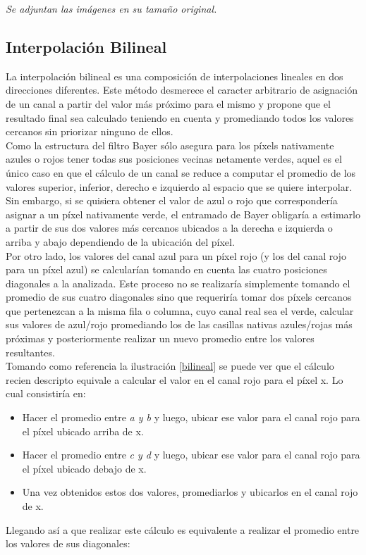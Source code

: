 \documentclass[a4paper]{article}
\begin{document}
\textit{Se adjuntan las im\'agenes en su tama\~no original.}

\newpage
\subsection{Interpolaci\'on Bilineal}

La interpolación bilineal es una composición de interpolaciones lineales en dos direcciones diferentes. Este método desmerece el caracter arbitrario de asignación de un canal a partir del valor más próximo para el mismo y propone que el resultado final sea calculado teniendo en cuenta y promediando todos los valores cercanos sin priorizar ninguno de ellos. \\

Como la estructura del filtro Bayer sólo asegura para los p\'ixels nativamente azules o rojos tener todas sus posiciones vecinas netamente verdes, aquel es el único caso en que el cálculo de un canal se reduce a computar el promedio de los valores superior, inferior, derecho e izquierdo al espacio que se quiere interpolar.\\

Sin embargo, si se quisiera obtener el valor de azul o rojo que correspondería asignar a un p\'ixel nativamente verde, el entramado de Bayer obligaría a estimarlo a partir de sus dos valores m\'as cercanos ubicados a la derecha e izquierda o arriba y abajo dependiendo de la ubicaci\'on del p\'ixel. \\

Por otro lado, los valores del canal azul para un p\'ixel rojo (y los del canal rojo para un p\'ixel azul) se calcularían tomando en cuenta las cuatro posiciones diagonales a la analizada. Este proceso no se realizar\'ia simplemente tomando el promedio de sus cuatro diagonales sino que requeriría tomar dos p\'ixels cercanos que pertenezcan a la misma fila o columna, cuyo canal real sea el verde, calcular sus valores de azul/rojo promediando los de las casillas nativas azules/rojas más próximas y posteriormente realizar un nuevo promedio entre los valores resultantes.\\

Tomando como referencia la ilustración \ref{bilineal} se puede ver que el cálculo recien descripto equivale a calcular el valor en el canal rojo para el p\'ixel x. Lo cual consistir\'ia en: 

\begin{itemize}
 
\item Hacer el promedio entre \textit{a y b} y luego, ubicar ese valor para el canal rojo para el p\'ixel ubicado arriba de x.

\item Hacer el promedio entre \textit{c y d} y luego, ubicar ese valor para el canal rojo para el p\'ixel ubicado debajo de x.

\item Una vez obtenidos estos dos valores, promediarlos y ubicarlos en el canal rojo de x.\\
\end{itemize}
Llegando as\'i a que realizar este c\'alculo es equivalente a realizar el promedio entre los valores de sus diagonales:
\end{document}
